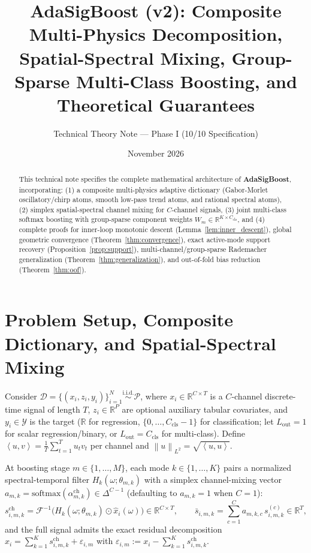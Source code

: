 \documentclass[11pt]{article}
\title{\textbf{AdaSigBoost (v2): Composite Multi-Physics Decomposition, Spatial-Spectral Mixing, Group-Sparse Multi-Class Boosting, and Theoretical Guarantees}}
\author{Technical Theory Note --- Phase I (10/10 Specification)}
\date{November 2026}
\newcommand{\R}{\mathbb{R}}
\newcommand{\norm}[1]{\left\lVert #1 \right\rVert}
\newcommand{\inner}[2]{\left\langle #1, #2 \right\rangle}
\begin{document}
\maketitle

\begin{abstract}
This technical note specifies the complete mathematical architecture of \textbf{AdaSigBoost}, incorporating: (1) a composite multi-physics adaptive dictionary (Gabor-Morlet oscillatory/chirp atoms, smooth low-pass trend atoms, and rational spectral atoms), (2) simplex spatial-spectral channel mixing for $C$-channel signals, (3) joint multi-class softmax boosting with group-sparse component weights $W_m \in \R^{K \times C_{\mathrm{cls}}}$, and (4) complete proofs for inner-loop monotonic descent (Lemma~\ref{lem:inner_descent}), global geometric convergence (Theorem~\ref{thm:convergence}), exact active-mode support recovery (Proposition~\ref{prop:support}), multi-channel/group-sparse Rademacher generalization (Theorem~\ref{thm:generalization}), and out-of-fold bias reduction (Theorem~\ref{thm:oof}).
\end{abstract}

\section{Problem Setup, Composite Dictionary, and Spatial-Spectral Mixing}
Consider $\mathcal{D} = \{(x_i, z_i, y_i)\}_{i=1}^N \stackrel{\mathrm{i.i.d.}}{\sim} \mathcal{P}$, where $x_i \in \R^{C \times T}$ is a $C$-channel discrete-time signal of length $T$, $z_i \in \R^P$ are optional auxiliary tabular covariates, and $y_i \in \mathcal{Y}$ is the target ($\R$ for regression, $\{0, \dots, C_{\mathrm{cls}}-1\}$ for classification; let $L_{\mathrm{out}} = 1$ for scalar regression/binary, or $L_{\mathrm{out}} = C_{\mathrm{cls}}$ for multi-class). Define $\inner{u}{v} = \frac{1}{T}\sum_{t=1}^T u_t v_t$ per channel and $\norm{u}_{L^2} = \sqrt{\inner{u}{u}}$.

At boosting stage $m \in \{1, \dots, M\}$, each mode $k \in \{1, \dots, K\}$ pairs a normalized spectral-temporal filter $H_k(\omega; \theta_{m,k})$ with a simplex channel-mixing vector $a_{m,k} = \mathrm{softmax}(\alpha_{m,k}^{\mathrm{ch}}) \in \Delta^{C-1}$ (defaulting to $a_{m,k} = 1$ when $C=1$):
\begin{equation}
    s_{i,m,k}^{\mathrm{ch}} = \mathcal{F}^{-1}\!\big( H_k(\omega; \theta_{m,k}) \odot \hat{x}_i(\omega) \big) \in \R^{C \times T}, \qquad \bar{s}_{i,m,k} = \sum_{c=1}^C a_{m,k,c}\, s_{i,m,k}^{(c)} \in \R^T,
    \label{eq:spatial_spectral}
\end{equation}
and the full signal admits the exact residual decomposition $x_i = \sum_{k=1}^K s_{i,m,k}^{\mathrm{ch}} + \varepsilon_{i,m}$ with $\varepsilon_{i,m} := x_i - \sum_{k=1}^K s_{i,m,k}^{\mathrm{ch}}$.
\end{document}
